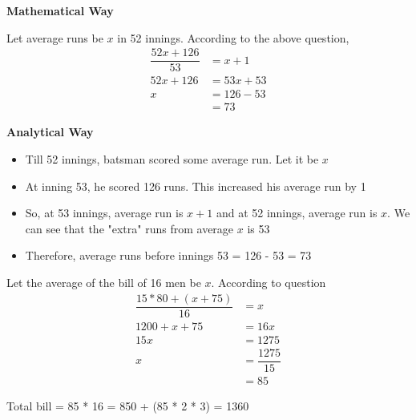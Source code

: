 
\begin{multicols}{2}
    
    \textbf{Mathematical Way}
   
    Let average runs be $x$ in 52 innings. According to the above question, 
    \begin{align*}
        \dfrac{52x + 126}{53} &= x + 1 \tag{$x$ is average run per inning} \\
        52x + 126 &= 53x + 53 \\
        x &= 126 - 53 \\
        &= 73
    \end{align*}
    
    \columnbreak
    
    \textbf{Analytical Way}
    
    \begin{itemize}
        \item Till 52 innings, batsman scored some average run. Let it be $x$
        \item At inning 53, he scored 126 runs. This increased his average run by 1
        \item So, at 53 innings, average run is $x+1$ and at 52 innings, average run is $x$. We can see that the "extra" runs from average $x$ is 53
        \item Therefore, average runs before innings 53 = 126 - 53 = 73
    \end{itemize}
\end{multicols}


Let the average of the bill of 16 men be $x$. According to question
\begin{align*}
    \dfrac{15 * 80 + (x + 75)}{16} &= x \\
    1200 + x + 75 &= 16x \\
    15x &= 1275 \\
    x &= \dfrac{1275}{15} \\
    &= 85
\end{align*}

Total bill = 85 * 16 = 850 + (85 * 2 * 3) = 1360


